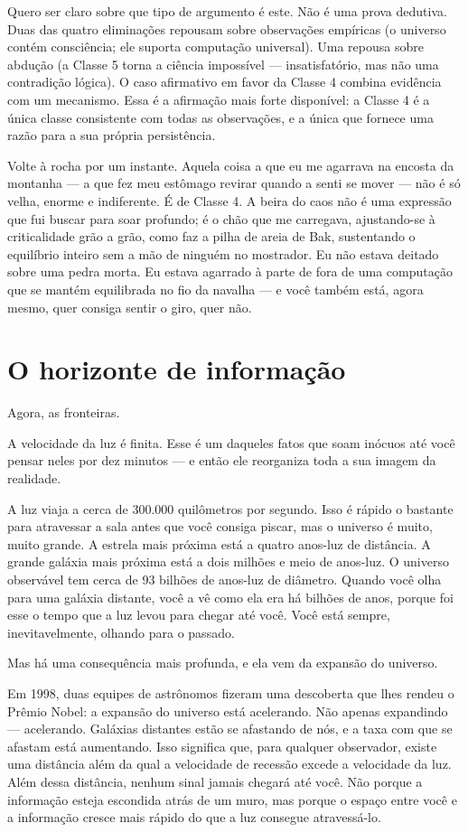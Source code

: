 \documentclass[11pt, twoside, openright]{book}
\begin{document}
Quero ser claro sobre que tipo de argumento é este. Não é uma prova dedutiva. Duas das quatro eliminações repousam sobre observações empíricas (o universo contém consciência; ele suporta computação universal). Uma repousa sobre abdução (a Classe 5 torna a ciência impossível --- insatisfatório, mas não uma contradição lógica). O caso afirmativo em favor da Classe 4 combina evidência com um mecanismo. Essa é a afirmação mais forte disponível: a Classe 4 é a única classe consistente com todas as observações, e a única que fornece uma razão para a sua própria persistência.

Volte à rocha por um instante. Aquela coisa a que eu me agarrava na encosta da montanha --- a que fez meu estômago revirar quando a senti se mover --- não é só velha, enorme e indiferente. É de Classe 4. A beira do caos não é uma expressão que fui buscar para soar profundo; é o chão que me carregava, ajustando-se à criticalidade grão a grão, como faz a pilha de areia de Bak, sustentando o equilíbrio inteiro sem a mão de ninguém no mostrador. Eu não estava deitado sobre uma pedra morta. Eu estava agarrado à parte de fora de uma computação que se mantém equilibrada no fio da navalha --- e você também está, agora mesmo, quer consiga sentir o giro, quer não.


\section*{O horizonte de informação}

Agora, as fronteiras.

A velocidade da luz é finita. Esse é um daqueles fatos que soam inócuos até você pensar neles por dez minutos --- e então ele reorganiza toda a sua imagem da realidade.

A luz viaja a cerca de 300.000 quilômetros por segundo. Isso é rápido o bastante para atravessar a sala antes que você consiga piscar, mas o universo é muito, muito grande. A estrela mais próxima está a quatro anos-luz de distância. A grande galáxia mais próxima está a dois milhões e meio de anos-luz. O universo observável tem cerca de 93 bilhões de anos-luz de diâmetro. Quando você olha para uma galáxia distante, você a vê como ela era há bilhões de anos, porque foi esse o tempo que a luz levou para chegar até você. Você está sempre, inevitavelmente, olhando para o passado.

Mas há uma consequência mais profunda, e ela vem da expansão do universo.

Em 1998, duas equipes de astrônomos fizeram uma descoberta que lhes rendeu o Prêmio Nobel: a expansão do universo está acelerando. Não apenas expandindo --- acelerando. Galáxias distantes estão se afastando de nós, e a taxa com que se afastam está aumentando. Isso significa que, para qualquer observador, existe uma distância além da qual a velocidade de recessão excede a velocidade da luz. Além dessa distância, nenhum sinal jamais chegará até você. Não porque a informação esteja escondida atrás de um muro, mas porque o espaço entre você e a informação cresce mais rápido do que a luz consegue atravessá-lo.
\end{document}
